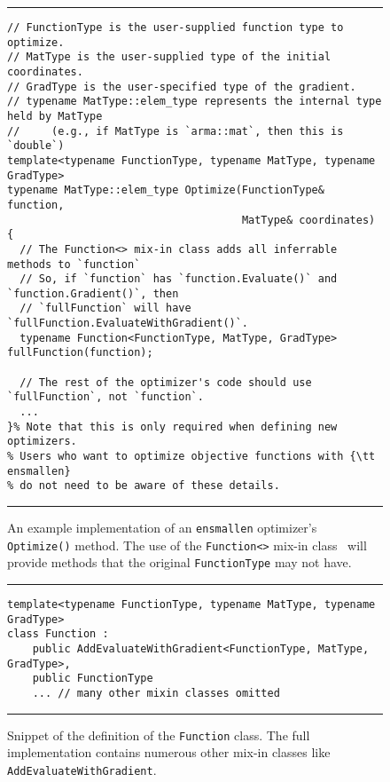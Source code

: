 \begin{figure}[t]
\hrule
\vspace{1ex}
\begin{verbatim}
// FunctionType is the user-supplied function type to optimize.
// MatType is the user-supplied type of the initial coordinates.
// GradType is the user-specified type of the gradient.
// typename MatType::elem_type represents the internal type held by MatType
//     (e.g., if MatType is `arma::mat`, then this is `double`)
template<typename FunctionType, typename MatType, typename GradType>
typename MatType::elem_type Optimize(FunctionType& function,
                                     MatType& coordinates)
{
  // The Function<> mix-in class adds all inferrable methods to `function`
  // So, if `function` has `function.Evaluate()` and `function.Gradient()`, then
  // `fullFunction` will have `fullFunction.EvaluateWithGradient()`.
  typename Function<FunctionType, MatType, GradType> fullFunction(function);

  // The rest of the optimizer's code should use `fullFunction`, not `function`.
  ...
}% Note that this is only required when defining new optimizers.
% Users who want to optimize objective functions with {\tt ensmallen}
% do not need to be aware of these details.

\end{verbatim}
\hrule
\vspace*{-0.5em}
\caption{An example implementation of an {\tt ensmallen} optimizer's
{\tt Optimize()} method.
The use of the {\tt Function<>} mix-in class~\cite{smaragdakis2000mixin}
will provide methods that the original {\tt FunctionType} may not have.
}
\label{fig:ex_optimize}
\end{figure}

\begin{figure}[t!]
\hrule
\vspace{1ex}
\begin{verbatim}
template<typename FunctionType, typename MatType, typename GradType>
class Function :
    public AddEvaluateWithGradient<FunctionType, MatType, GradType>,
    public FunctionType
    ... // many other mixin classes omitted
\end{verbatim}
\hrule
\vspace*{-0.5em}
\caption{Snippet of the definition of the {\tt Function} class.  The full
implementation contains numerous other mix-in classes like {\tt
AddEvaluateWithGradient}.}
\label{fig:function_snippet}
\end{figure}

